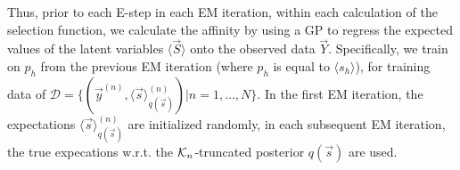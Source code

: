 Thus, prior to each E-step in each EM iteration, within each calculation of the selection function, we calculate the affinity by using a GP to regress the expected values of the latent variables $\langle \vec{S} \rangle$ onto the observed data $\vec{Y}$.  
Specifically, we train on $p_h$ from the previous EM iteration (where $p_h$ is equal to $\langle s_h \rangle$), for 
training data of 
$\mathcal{D} = \{ (\vec{y}^{(n)}, \langle\vec{s}\rangle^{(n)}_{q(\vec{s})}) | n = 1,\dots, N \}$.
%
In the first EM iteration, the expectations $\langle\vec{s}\rangle^{(n)}_{q(\vec{s})}$ are initialized randomly, 
in each subsequent EM iteration, the true expecations w.r.t. the $\mathcal{K}_{n}$-truncated posterior $q(\vec{s})$ are used. 

